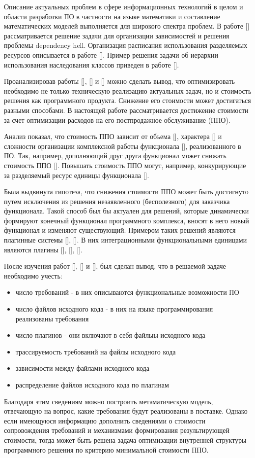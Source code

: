 Описание актуальных проблем в сфере информационных технологий в целом и области разработки ПО в частности на языке математики и составление математических моделей выполняется для широкого спектра проблем. В работе [] рассматривается решение задачи для организации зависимостей и решения проблемы dependency hell. Организация расписания использования разделяемых ресурсов описывается в работе []. Пример решения задачи об иерархии использования наследования классов приведен в работе []. 

Проанализировав работы [], [] и [] можно сделать вывод, что оптимизировать необходимо не только техническую реализацию актуальных задач, но и стоимость решения как программного продукта. Снижение его стоимости может достигаться разными способами. В настоящей работе рассматривается достижение стоимости за счет оптимизации расходов на его постпродажное обслуживание (ППО).

Анализ показал, что стоимость ППО зависит от объема [], характера [] и сложности организации комплексной работы функционала [], реализованного в ПО. Так, например, дополняющий друг друга функционал может снижать стоимость ППО []. Повышать стоимость ППО могут, например, конкурирующие за разделяемый ресурс единицы функционала [].

Была выдвинута гипотеза, что снижения стоимости ППО может быть достигнуто путем исключения из решения незаявленного (бесполезного) для заказчика функционала. Такой способ был бы актуален для решений, которые динамически формируют конечный функционал программного комплекса, вносят в него новый функционал и изменяют существующий. Примером таких решений являются плагинные системы [], []. В них интеграционными функциональными единицами являются плагины [], [], [].

После изучения работ [], [] и [], был сделан вывод, что в решаемой задаче необходимо учесть:
\begin{itemize}
  \item число требований - в них описываются функциональные возможности ПО
  \item число файлов исходного кода - в них на языке программирования реализованы требования
  \item число плагинов - они включают в себя файлыы исходного кода
  \item трассируемость требований на файлы исходного кода
  \item зависимости между файлами исходного кода
  \item распределение файлов исходного кода по плагинам
\end{itemize}

Благодаря этим сведениям можно построить метаматическую модель, отвечающую на вопрос, какие требования будут реализованы в поставке. Однако если имеющуюся информацию дополнить сведениями о стоимости сопровождения требований и механизмами формирования результирующей стоимости, тогда может быть решена задача оптимизации внутренней структуры программного решения по критерию минимальной стоимости ППО.
